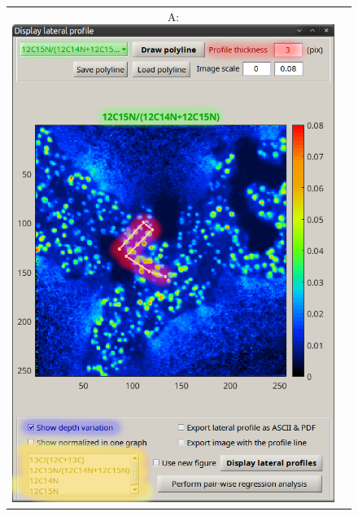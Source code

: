 \begin{figure}[!ht]
\centering
\begin{tabular}{cc}
A: \includegraphics[scale=0.33, valign=t]{figs3/LANS-lateral1}
&

\end{tabular}
\end{figure}
